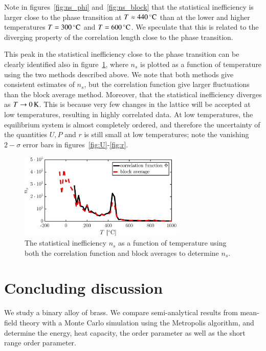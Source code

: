 Note in figures~\ref{fig:ns_phi} and~\ref{fig:ns_block} that the statistical inefficiency is larger close to the phase transition at $T \approx \unit[440]{^\circ C}$ than at the lower and higher temperatures  $T = \unit[300]{^\circ C}$ and $T = \unit[600]{^\circ C}$. We speculate that this is related to the diverging property of the correlation length close to the phase transition. 

This peak in the statistical inefficiency close to the phase transition can be clearly identified also in figure~\ref{fig:ns_both}, where $n_s$ is plotted as a function of temperature using the two methods described above. We note that both methods give consistent estimates of $n_s$, but the correlation function give larger fluctuations than the block average method. Moreover, that the statistical inefficiency diverges as $T \rightarrow \unit[0]{K}$. This is because very few changes in the lattice will be accepted at low temperatures, resulting in highly correlated data. At low temperatures, the equilibrium system is almost completely ordered, and therefore the uncertainty of the quantities $U, P$ and $r$ is still small at low temperatures; note the vanishing $2-\sigma$ error bars in figures~\ref{fig:U}-\ref{fig:r}. 

\begin{figure}[!ht]
\begin{center}
  \includegraphics[width=0.7\textwidth]{../figures/stat_inefficiency_both} 
  \caption{The statistical inefficiency $n_s$ as a function of temperature using both the correlation function and block averages to determine $n_s$.}
  \label{fig:ns_both}
\end{center}
\end{figure}
\section*{Concluding discussion}
We study a binary alloy of brass. We compare semi-analytical results from mean-field theory with a Monte Carlo simulation using the Metropolis algorithm, and determine the energy, heat capacity, the order parameter as well as the short range order parameter. 

